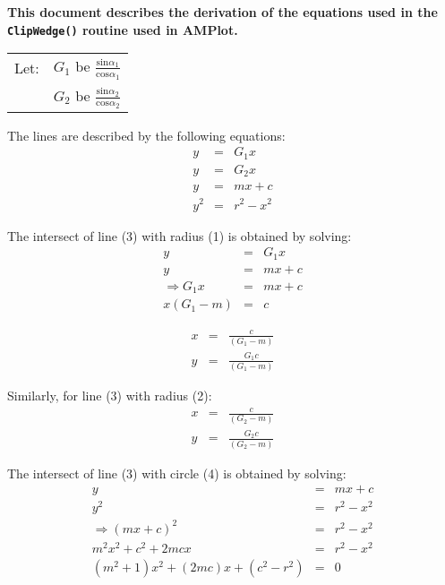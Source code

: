 \newcommand{\amplot}{\mbox{\bf AMPlot}}

{\large\bf This document describes the derivation of the equations used in the
{\tt ClipWedge()} routine used in \amplot.}
\vspace{2in}

\begin{tabular}{ll}
Let: & $G_1$ be $\frac{\mbox{sin}\alpha_1}{\mbox{cos}\alpha_1}$ \\
     & $G_2$ be $\frac{\mbox{sin}\alpha_2}{\mbox{cos}\alpha_2}$ \\
\end{tabular}

The lines are described by the following equations:
\begin{eqnarray}
y   & = & G_1 x      \\
y   & = & G_2 x      \\
y   & = & mx + c     \\
y^2 & = & r^2 - x^2
\end{eqnarray}

The intersect of line (3) with radius (1) is obtained by solving:
\begin{eqnarray*}
y                 & = & G_1 x    \\
y                 & = & mx + c   \\
\Rightarrow G_1 x & = & mx + c   \\
x(G_1 -m)         & = & c        
\end{eqnarray*}

\begin{eqnarray}
x & = & \frac{c}{(G_1 - m)}      \\
y & = & \frac{G_1 c}{(G_1 - m)}
\end{eqnarray}

Similarly, for line (3) with radius (2):
\begin{eqnarray}
x & = & \frac{c}{(G_2 - m)}      \\
y & = & \frac{G_2 c}{(G_2 - m)}
\end{eqnarray}

\newpage
The intersect of line (3) with circle (4) is obtained by solving:
\begin{eqnarray*}
y                                   & = & mx + c      \\
y^2                                 & = & r^2 - x^2   \\
\Rightarrow (mx + c)^2              & = & r^2 - x^2   \\
m^2x^2 + c^2 + 2mcx                 & = & r^2-x^2     \\
(m^2 + 1)x^2 + (2mc)x + (c^2 - r^2) & = & 0           \\
\end{eqnarray*}

